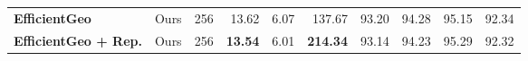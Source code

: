 \begin{table}[t]
\begin{tabular*}{\textwidth}{@{\extracolsep{\fill}}lcrrrrrrrr@{}}
\midrule
\textbf{EfficientGeo} & Ours & 256 & 13.62 & 6.07 & 137.67 & 93.20 & 94.28 & 95.15 & 92.34 \\
\textbf{EfficientGeo + Rep.} & Ours & 256 & \textbf{13.54} & 6.01 & \textbf{214.34} & 93.14 & 94.23 & 95.29 & 92.32 \\
\bottomrule
\end{tabular*}
\par{}
\end{table}
